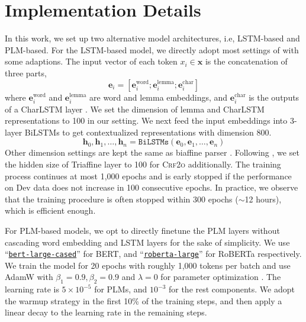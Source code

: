 \documentclass[11pt]{article}
\begin{document}



\appendix

\section{Implementation Details}\label{sec:impl}

In this work, we set up two alternative model architectures, i.e, LSTM-based and PLM-based.
For the LSTM-based model, we directly adopt most settings of \citet{dozat-etal-2017-biaffine} with some adaptions.
The input vector of each token $x_i\in\boldsymbol{x}$ is the concatenation of three parts,
\begin{equation*}
    \mathbf{e}_i = \left[\mathbf{e}^{\mathrm{word}}_i;\mathbf{e}^{\mathrm{lemma}}_i;\mathbf{e}^{\mathrm{char}}_i\right]
\end{equation*}
where $\mathbf{e}_i^{\mathrm{word}}$ and $\mathbf{e}_i^{\mathrm{lemma}}$ are word and lemma embeddings, and $\mathbf{e}^{\mathrm{char}}_i$ is the outputs of a CharLSTM layer \cite{lample-etal-2016-neural}.
We set the dimension of lemma and CharLSTM representations to 100 in our setting.
We next feed the input embeddings into 3-layer BiLSTMs \cite{yarin-etal-2016-dropout} to get contextualized representations with dimension 800.
\begin{equation*}
    \mathbf{h}_0,\mathbf{h}_1,\dots,\mathbf{h}_n=\mathtt{BiLSTMs}(\mathbf{e}_0,\mathbf{e}_1,\dots,\mathbf{e}_n)
\end{equation*}
Other dimension settings are kept the same as biaffine parser \cite{dozat-etal-2017-biaffine}.
Following \citet{zhang-etal-2020-efficient}, we set the hidden size of Triaffine layer to 100 for \textsc{Crf2o} additionally.
The training process continues at most 1,000 epochs and is early stopped if the performance on Dev data does not increase in 100 consecutive epochs.
In practice, we observe that the training procedure is often stopped within 300 epochs ($\sim$12 hours), which is efficient enough.

For PLM-based models, we opt to directly finetune the PLM layers without cascading word embedding and LSTM layers for the sake of simplicity.
We use ``\href{https://huggingface.co/bert-large-cased}{\texttt{bert-large-cased}}'' for BERT, and ``\href{https://huggingface.co/roberta-large}{\texttt{roberta-large}}'' for RoBERTa respectively.
We train the model for 20 epochs with roughly 1,000 tokens per batch and use AdamW \cite{kingma-ba-2015-adam,ilya-etal-2018-adamw} with $\beta_1=0.9,\beta_2=0.9$ and $\lambda=0$ for parameter optimization .
The learning rate is $5\times 10^{-5}$ for PLMs, and $10^{-3}$ for the rest components.
We adopt the warmup strategy in the first 10\% of the training steps, and then apply a linear decay to the learning rate in the remaining steps.
\end{document}
